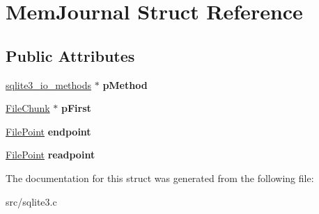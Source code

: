 \hypertarget{struct_mem_journal}{\section{Mem\-Journal Struct Reference}
\label{struct_mem_journal}
}
\subsection*{Public Attributes}
\begin{DoxyCompactItemize}
\item 
\hypertarget{struct_mem_journal_a00c1523cce1bcfadc2b672b8703a78cb}{\hyperlink{structsqlite3__io__methods}{sqlite3\-\_\-io\-\_\-methods} $\ast$ {\bfseries p\-Method}}\label{struct_mem_journal_a00c1523cce1bcfadc2b672b8703a78cb}

\item 
\hypertarget{struct_mem_journal_ade7a6dea7b38a8a86f33476ae207765f}{\hyperlink{struct_file_chunk}{File\-Chunk} $\ast$ {\bfseries p\-First}}\label{struct_mem_journal_ade7a6dea7b38a8a86f33476ae207765f}

\item 
\hypertarget{struct_mem_journal_ac69637f95cfbce175cbeef00f71e59a9}{\hyperlink{struct_file_point}{File\-Point} {\bfseries endpoint}}\label{struct_mem_journal_ac69637f95cfbce175cbeef00f71e59a9}

\item 
\hypertarget{struct_mem_journal_a5645d38e1a488b62b5f63112628bf472}{\hyperlink{struct_file_point}{File\-Point} {\bfseries readpoint}}\label{struct_mem_journal_a5645d38e1a488b62b5f63112628bf472}

\end{DoxyCompactItemize}


The documentation for this struct was generated from the following file\-:\begin{DoxyCompactItemize}
\item 
src/sqlite3.\-c\end{DoxyCompactItemize}

